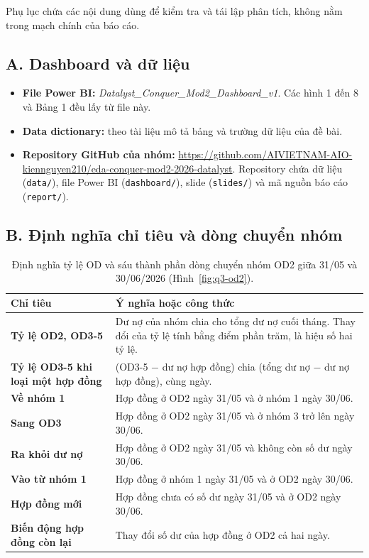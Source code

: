 \documentclass[12pt]{eDA_conquer2026}
\begin{document}
\begin{appendices}

Phụ lục chứa các nội dung dùng để kiểm tra và tái lập phân tích, không nằm trong mạch chính của báo cáo.

\subsection*{A. Dashboard và dữ liệu}

\begin{itemize}[label=--, leftmargin=0.8cm, itemsep=0.2em]
    \item \textbf{File Power BI:} \textit{Datalyst\_Conquer\_Mod2\_Dashboard\_v1}. Các hình 1 đến 8 và Bảng 1 đều lấy từ file này.
    \item \textbf{Data dictionary:} theo tài liệu mô tả bảng và trường dữ liệu của đề bài.
    \item \textbf{Repository GitHub của nhóm:} \url{https://github.com/AIVIETNAM-AIO-kiennguyen210/eda-conquer-mod2-2026-datalyst}. Repository chứa dữ liệu (\texttt{data/}), file Power BI (\texttt{dashboard/}), slide (\texttt{slides/}) và mã nguồn báo cáo (\texttt{report/}).
\end{itemize}

\subsection*{B. Định nghĩa chỉ tiêu và dòng chuyển nhóm}

\begin{table}[H]
\centering
\caption{Định nghĩa tỷ lệ OD và sáu thành phần dòng chuyển nhóm OD2 giữa 31/05 và 30/06/2026 (Hình~\ref{fig:q3-od2}).}
\vspace{0.15cm}
\renewcommand{\arraystretch}{1.6}
\begin{tabularx}{0.95\linewidth}{@{}
    >{\raggedright\arraybackslash\bfseries}p{4.4cm}
    >{\raggedright\arraybackslash}X @{}}
  \toprule
  \textbf{Chỉ tiêu} & \textbf{Ý nghĩa hoặc công thức} \\
  \midrule
  Tỷ lệ OD2, OD3-5 & Dư nợ của nhóm chia cho tổng dư nợ cuối tháng. Thay đổi của tỷ lệ tính bằng điểm phần trăm, là hiệu số hai tỷ lệ. \\
  Tỷ lệ OD3-5 khi loại một hợp đồng & (OD3-5 $-$ dư nợ hợp đồng) chia (tổng dư nợ $-$ dư nợ hợp đồng), cùng ngày. \\
  Về nhóm 1 & Hợp đồng ở OD2 ngày 31/05 và ở nhóm 1 ngày 30/06. \\
  Sang OD3 & Hợp đồng ở OD2 ngày 31/05 và ở nhóm 3 trở lên ngày 30/06. \\
  Ra khỏi dư nợ & Hợp đồng ở OD2 ngày 31/05 và không còn số dư ngày 30/06. \\
  Vào từ nhóm 1 & Hợp đồng ở nhóm 1 ngày 31/05 và ở OD2 ngày 30/06. \\
  Hợp đồng mới & Hợp đồng chưa có số dư ngày 31/05 và ở OD2 ngày 30/06. \\
  Biến động hợp đồng còn lại & Thay đổi số dư của hợp đồng ở OD2 cả hai ngày. \\
  \bottomrule
\end{tabularx}
\end{table}


\end{appendices}
\end{document}

